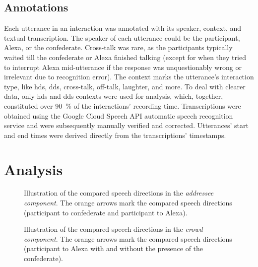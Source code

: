 \subsection*{Annotations}
\label{subsec:annotations_hhci}

Each utterance in an interaction was annotated with its speaker, context, and textual transcription.
The speaker of each utterance could be the participant, Alexa, or the confederate.
Cross-talk was rare, as the participants typically waited till the confederate or Alexa finished talking (except for when they tried to interrupt Alexa mid-utterance if the response was unquestionably wrong or irrelevant due to recognition error).
The context marks the utterance's interaction type, like \ac{hds}, \ac{dds}, cross-talk, off-talk, laughter, and more.
To deal with clearer data, only \ac{hds} and \ac{dds} contexts were used for analysis, which, together, constituted over \SI{90}{\percent} of the interactions' recording time.
Transcriptions were obtained using the Google Cloud Speech API automatic speech recognition service and were subsequently manually verified and corrected.
Utterances' start and end times were derived directly from the transcriptions' timestamps.

\section{Analysis}
\label{sec:analysis_hhci}

\begin{figure}[t]
	\centering
	\hfill
	\caption[\acs{hds} and \acs{dds} compared in confederate condition]
		{Illustration of the compared speech directions in the \emph{addressee component}.
		The orange arrows mark the compared speech directions (participant to confederate and participant to Alexa).}
	\label{fig:condition_comparison_addressee}
\end{figure}

\begin{figure}[t]
	\centering
	\hfill
	\caption[\acs{dds} compared in solo and confederate conditions]
		{Illustration of the compared speech directions in the \emph{crowd component}.
		The orange arrows mark the compared speech directions (participant to Alexa with and without the presence of the confederate).}
	\label{fig:condition_comparison_crowd}
\end{figure}

